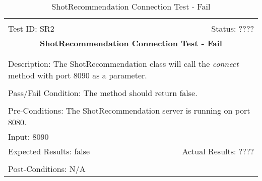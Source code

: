 \documentclass[11pt]{article}
\begin{document}
\begin{center}
\begin{table}[H]
\begin{tabular}{|l r|}\hline&\\[-2mm]
	Test ID: SR2	&Status: ????\\[-3mm]
	\multicolumn{2}{|c|}{\textbf{\large{ShotRecommendation Connection Test - Fail}}}\\&\\\hline&\\[-3mm]
	\multicolumn{2}{|p{\textwidth}|}{Description: The ShotRecommendation class will call the \textit{connect} method with port 8090 as a parameter.}\\[1mm]\hline&\\[-3mm]
	\multicolumn{2}{|p{\textwidth}|}{Pass/Fail Condition: The method should return false.}\\[1mm]\hline&\\[-3mm]
	\multicolumn{2}{|p{\textwidth}|}{Pre-Conditions: The ShotRecommendation server is running on port 8080.}\\[4mm]
	\multicolumn{2}{|p{\textwidth}|}{Input: 8090}\\[2mm]\hline
	\multicolumn{1}{|p{0.49\textwidth}}{Expected Results: false}	&\multicolumn{1}{|p{0.45\textwidth}|}{Actual Results: ????}\\\hline&\\[-3mm]
	\multicolumn{2}{|p{\textwidth}|}{Post-Conditions: N/A}\\\hline
\end{tabular}
\caption{ShotRecommendation Connection Test - Fail}
\end{table}
\end{center}
\end{document}

